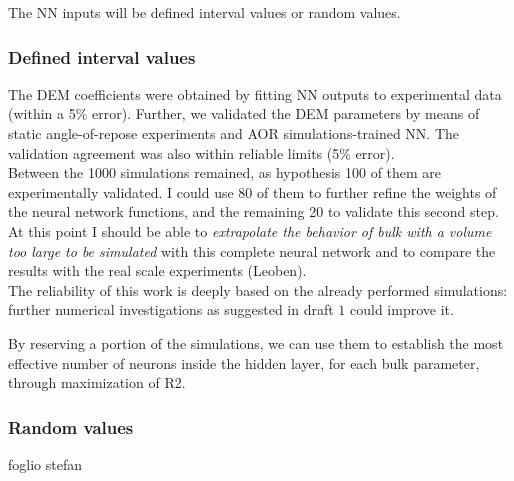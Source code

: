 The NN inputs will be defined interval values or random values.\\

\subsubsection{Defined interval values}
\label{subsubsection:definedintervalvalues}



The DEM coefficients were obtained by fitting NN outputs to experimental data (within a 5\% error).
Further, we validated the DEM parameters by means of static angle-of-repose experiments and AOR simulations-trained NN.
The validation agreement was also within reliable limits (5\% error).\\

Between the 1000 simulations remained, as hypothesis 100 of them are experimentally validated. I could use 80 of them to further refine the weights of the neural network functions, and the remaining 20 to validate this second step. At this point I should be able to \textit{extrapolate the behavior of bulk with a volume too large to be simulated} with this complete neural network and to compare the results with the real scale experiments (Leoben).\\

The reliability of this work is deeply based on the already performed simulations: further numerical investigations as suggested in draft $1$ could improve it.

By reserving a portion of the simulations, we can use them to establish the most effective number of neurons inside the hidden layer, for each bulk parameter, through maximization of R2.\\


\subsubsection{Random values}
\label{subsubsection:randomvalues}

foglio stefan
